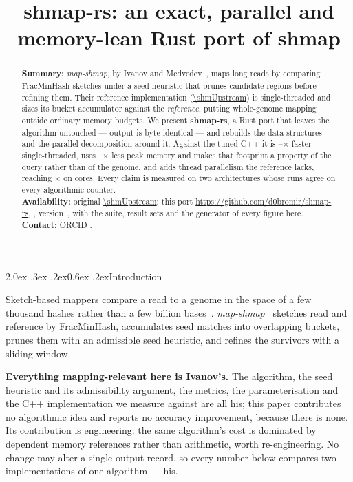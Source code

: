 \documentclass[10pt,a4paper,twocolumn]{article}
\title{\vspace{-1.0cm}\textbf{shmap-rs: an exact, parallel and memory-lean
       Rust port of shmap}}
\author{\shmAuthors}
\date{}
\makeatletter
\renewcommand\section{\@startsection{section}{1}{0pt}%
  {2.0ex \@plus .3ex \@minus .2ex}{0.6ex \@plus.2ex}{\normalsize\bfseries}}
\makeatother
\begin{document}
\maketitle
\vspace{-0.7cm}

\begin{abstract}
\noindent
\textbf{Summary:} \emph{map-shmap}, by Ivanov and Medvedev~\cite{shmap}, maps
long reads by comparing FracMinHash sketches under a seed heuristic that prunes
candidate regions before refining them. Their reference implementation
(\url{\shmUpstream}) is single-threaded and sizes its bucket
accumulator against the \emph{reference}, putting whole-genome mapping outside
ordinary memory budgets. We present \textbf{shmap-rs}, a Rust port that leaves
the algorithm untouched --- output is byte-identical --- and rebuilds the data
structures and the parallel decomposition around it. Against the tuned C++ it
is \shmSpeedupXMin--\shmSpeedupXMax$\times$ faster single-threaded, uses
\shmRssRatioMin--\shmRssRatioMax$\times$ less peak memory and makes that
footprint a property of the query rather than of the genome, and adds thread
parallelism the reference lacks, reaching \shmScaleXPeak$\times$ on
\shmCoresX{} cores. Every claim is measured on two architectures whose runs
agree on every algorithmic counter.\\[0.2em]
\textbf{Availability:} original \url{\shmUpstream}; this port
\url{https://github.com/d0bromir/shmap-rs}, \shmLicense, version~\shmVersion,
with the suite, result sets and the generator of every figure here.\\[0.2em]
\textbf{Contact:} ORCID \shmOrcids.
\end{abstract}

\section{Introduction}

Sketch-based mappers compare a read to a genome in the space of a few thousand
hashes rather than a few billion bases~\cite{mash}.
\emph{map-shmap}~\cite{shmap} sketches read and reference by FracMinHash,
accumulates seed matches into overlapping buckets, prunes them with an
admissible seed heuristic, and refines the survivors with a sliding window.

\textbf{Everything mapping-relevant here is Ivanov's.} The algorithm, the seed
heuristic and its admissibility argument, the metrics, the parameterisation and
the C++ implementation we measure against are all his; this paper contributes
no algorithmic idea and reports no accuracy improvement, because there is none.
Its contribution is engineering: the same algorithm's cost is dominated by
dependent memory references rather than arithmetic, worth re-engineering. No
change may alter a single output record, so every number below compares two
implementations of one algorithm --- his.
\end{document}
